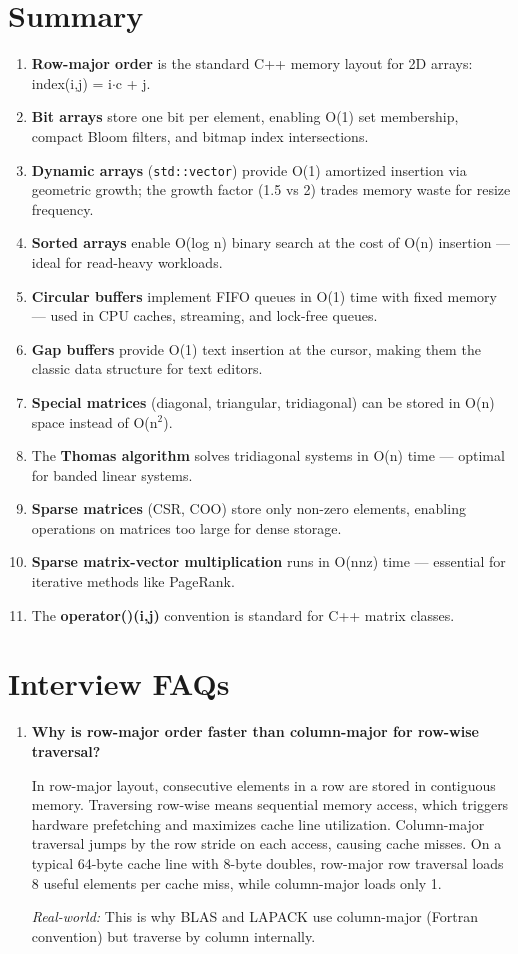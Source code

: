 \section{Summary}

\begin{enumerate}
\item \textbf{Row-major order} is the standard C++ memory layout for 2D arrays: index(i,j) = i$\cdot $c + j.
\item \textbf{Bit arrays} store one bit per element, enabling O(1) set membership, compact Bloom filters, and bitmap index intersections.
\item \textbf{Dynamic arrays} (\texttt{std::vector}) provide O(1) amortized insertion via geometric growth; the growth factor (1.5 vs 2) trades memory waste for resize frequency.
\item \textbf{Sorted arrays} enable O(log n) binary search at the cost of O(n) insertion — ideal for read-heavy workloads.
\item \textbf{Circular buffers} implement FIFO queues in O(1) time with fixed memory — used in CPU caches, streaming, and lock-free queues.
\item \textbf{Gap buffers} provide O(1) text insertion at the cursor, making them the classic data structure for text editors.
\item \textbf{Special matrices} (diagonal, triangular, tridiagonal) can be stored in O(n) space instead of O(n$^{2}$).
\item The \textbf{Thomas algorithm} solves tridiagonal systems in O(n) time — optimal for banded linear systems.
\item \textbf{Sparse matrices} (CSR, COO) store only non-zero elements, enabling operations on matrices too large for dense storage.
\item \textbf{Sparse matrix-vector multiplication} runs in O(nnz) time — essential for iterative methods like PageRank.
\item The \textbf{operator()(i,j)} convention is standard for C++ matrix classes.
\end{enumerate}

\section{Interview FAQs}

\begin{enumerate}
\item \textbf{Why is row-major order faster than column-major for row-wise traversal?}

In row-major layout, consecutive elements in a row are stored in contiguous memory. Traversing row-wise means sequential memory access, which triggers hardware prefetching and maximizes cache line utilization. Column-major traversal jumps by the row stride on each access, causing cache misses. On a typical 64-byte cache line with 8-byte doubles, row-major row traversal loads 8 useful elements per cache miss, while column-major loads only 1.

\textit{Real-world:} This is why BLAS and LAPACK use column-major (Fortran convention) but traverse by column internally.
\end{enumerate}

